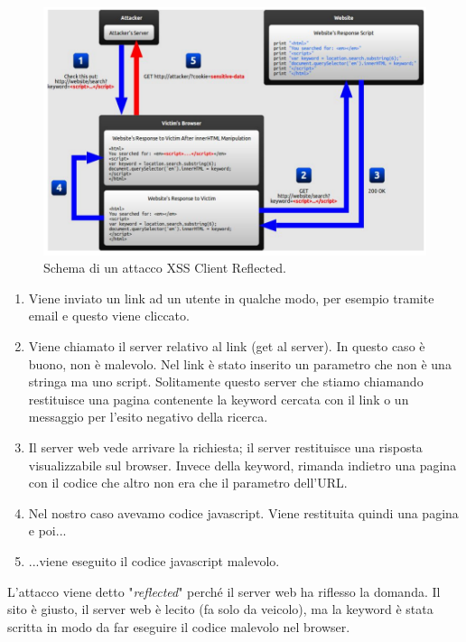 \begin{figure}[H]
      \centering
      \includegraphics[width=\textwidth, keepaspectratio]{capitoli/secure_coding/img/cap_9/xss1.png}
      \caption{Schema di un attacco XSS Client Reflected.}
\end{figure}

\begin{enumerate}
      \item Viene inviato un link ad un utente in qualche modo, per esempio
            tramite email e
            questo viene cliccato.
      \item Viene chiamato il server relativo al link (get al server).
            In questo caso è buono, non è
            malevolo. Nel link è stato inserito un parametro che non è una stringa
            ma uno script.
            Solitamente questo server che stiamo chiamando restituisce una
            pagina contenente la keyword
            cercata con il link
            o un messaggio per l'esito negativo della ricerca.
      \item Il server web vede arrivare la richiesta; il server restituisce una
            risposta visualizzabile
            sul browser. Invece della keyword, rimanda indietro una pagina con il codice
            che
            altro non era che il parametro dell'URL.
      \item Nel nostro caso avevamo codice javascript.
            Viene restituita quindi una pagina e poi...
      \item ...viene eseguito il codice javascript malevolo.
\end{enumerate}

L'attacco viene detto "\textit{reflected}" perché il server web ha riflesso la
domanda. Il sito è giusto,
il server web è lecito (fa solo da veicolo), ma la keyword è stata scritta in
modo da far eseguire il codice malevolo nel browser.

